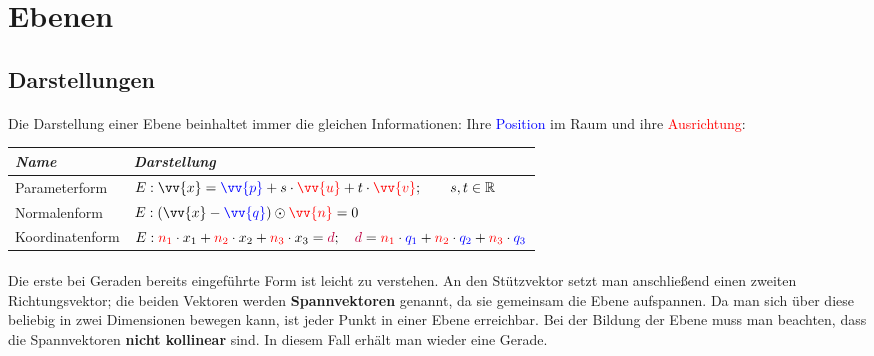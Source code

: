 \section{Ebenen}

    \subsection{Darstellungen}

        \paragraph{} Die Darstellung einer Ebene beinhaltet immer die gleichen Informationen: Ihre \textcolor{blue}{Position} im Raum und ihre
        \textcolor{red}{Ausrichtung}:\\
        \begin{center}
            \begin{tabular}{@{} *2l @{}}
                \emph{Name} & \emph{Darstellung}   \\\midrule
                Parameterform \qquad \qquad \qquad \qquad \qquad & $E:\vv{x}=\textcolor{blue}{\vv{p}} + s\cdot \textcolor{red}{\vv{u}} + t\cdot \textcolor{red}{\vv{v}} ; \qquad s,t \in \R $    \\
                Normalenform \qquad \qquad \qquad \qquad \qquad & $E:(\vv{x} - \textcolor{blue}{\vv{q}}) \odot \textcolor{red}{\vv{n}} = 0 $\\
                Koordinatenform \qquad \qquad \qquad \qquad \qquad & $E:\textcolor{red}{n_1} \cdot x_1 + \textcolor{red}{n_2} \cdot x_2 + \textcolor{red}{n_3} \cdot x_3 = \textcolor{purple}{d} ; \quad \textcolor{purple}{d} = \textcolor{red}{n_1} \cdot \textcolor{blue}{q_1} + \textcolor{red}{n_2} \cdot \textcolor{blue}{q_2} + \textcolor{red}{n_3} \cdot \textcolor{blue}{q_3} $ \\
            \end{tabular}
        \end{center}

        \paragraph{} Die erste bei Geraden bereits eingeführte Form ist leicht zu verstehen. An den Stützvektor setzt man anschließend einen
        zweiten Richtungsvektor; die beiden Vektoren werden \textbf{Spannvektoren} genannt, da sie gemeinsam die Ebene aufspannen. Da man
        sich über diese beliebig in zwei Dimensionen bewegen kann, ist jeder Punkt in einer Ebene erreichbar. Bei der Bildung der Ebene muss
        man beachten, dass die Spannvektoren \textbf{nicht kollinear} sind. In diesem Fall erhält man wieder eine Gerade.

